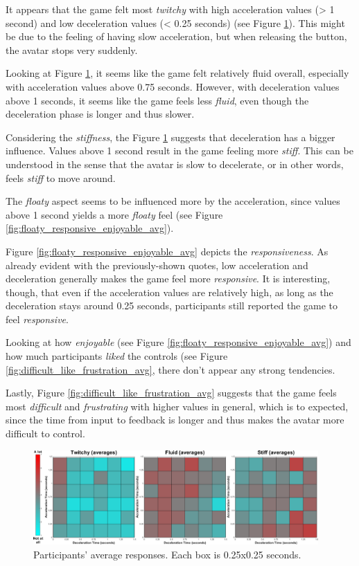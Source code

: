 It appears that the game felt most \textit{twitchy} with high acceleration values (> 1 second) and low deceleration values (< 0.25 seconds) (see Figure \ref{fig:twitchy_fluid_stiff_avg}). This might be due to the feeling of having slow acceleration, but when releasing the button, the avatar stops very suddenly.

Looking at Figure \ref{fig:twitchy_fluid_stiff_avg}, it seems like the game felt relatively fluid overall, especially with acceleration values above 0.75 seconds. However, with deceleration values above 1 seconds, it seems like the game feels less \textit{fluid}, even though the deceleration phase is longer and thus slower.

Considering the \textit{stiffness}, the Figure \ref{fig:twitchy_fluid_stiff_avg} suggests that deceleration has a bigger influence. Values above 1 second result in the game feeling more \textit{stiff}. This can be understood in the sense that the avatar is slow to decelerate, or in other words, feels \textit{stiff} to move around.

The \textit{floaty} aspect seems to be influenced more by the acceleration, since values above 1 second yields a more \textit{floaty} feel (see Figure \ref{fig:floaty_responsive_enjoyable_avg}).

Figure \ref{fig:floaty_responsive_enjoyable_avg} depicts the \textit{responsiveness}. As already evident with the previously-shown quotes, low acceleration and deceleration generally makes the game feel more \textit{responsive}. It is interesting, though, that even if the acceleration values are relatively high, as long as the deceleration stays around 0.25 seconds, participants still reported the game to feel \textit{responsive}.

Looking at how \textit{enjoyable} (see Figure \ref{fig:floaty_responsive_enjoyable_avg}) and how much participants \textit{liked} the controls (see Figure \ref{fig:difficult_like_frustration_avg}, there don't appear any strong tendencies.

Lastly, Figure \ref{fig:difficult_like_frustration_avg} suggests that the game feels most \textit{difficult} and \textit{frustrating} with higher values in general, which is to expected, since the time from input to feedback is longer and thus makes the avatar more difficult to control.

\begin{figure}[htbp]
\centering
\includegraphics[width=0.97\textwidth]{Pics/Classes/averages/twitchy_fluid_stiff_avg}
\caption{Participants' average responses. Each box is 0.25x0.25 seconds.}
\label{fig:twitchy_fluid_stiff_avg}
\end{figure}

